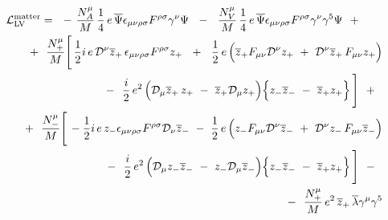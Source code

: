 \documentclass[12pt]{revtex4}
\newcommand{\slashed}[1]{\hbox{{$#1$}\llap{$/$}}}
\begin{document}
\begin{eqnarray}
\nonumber
\lefteqn{
     \mathcal{L}_{\mathrm{LV}}^{\mathrm{matter}}  = 
~~      %
-~
\frac{N_A^\mu}{M}\,
\frac{1}{4} \,e\,
\overline{\Psi} \epsilon_{\mu\nu\rho\sigma}
F^{\rho\sigma} \gamma^\nu \Psi      
~~-~~
\frac{N_V^\mu}{M}\,
\frac{1}{4} \,e\,
\overline{\Psi} \epsilon_{\mu\nu\rho\sigma}
F^{\rho\sigma} \gamma^\nu \gamma^5 \Psi 
~~+~~ 
}\\
\nonumber
&&
~~+~~
\frac{N_+^\mu}{M}
\Bigg[\,
\frac{1}{2}i \,e \, 
\mathcal{D}^\nu \overline{z}_+ \,
\epsilon_{\mu\nu\rho\sigma}F^{\rho\sigma} z_+ 
~~+~~
\frac{1}{2}\, e\,
\Big(
  \overline{z}_+ F_{\mu\nu}
  \mathcal{D}^\nu z_+ 
  ~+~
  \mathcal{D}^\nu \overline{z}_+ \,
  F_{\mu\nu} z_+
\Big) 
\\
\nonumber
&&
               \qquad
~~-~~
\frac{i}{2}\, e^2\,
\Big(
  \mathcal{D}_\mu \overline{z}_+ \,
   z_+ 
  ~-~
  \overline{z}_+ \mathcal{D}_\mu z_+
\Big)
\Big\{
  z_-  \overline{z}_- 
  ~-~
  \overline{z}_+  z_+
\Big\}
\,\Bigg] ~~+~~ \\
\nonumber
&&
~~+~~
\frac{N_-^\mu}{M}
\Bigg[\,
- \frac{1}{2} i\, e\,
z_- \epsilon_{\mu\nu\rho\sigma}F^{\rho\sigma}
\mathcal{D}_\nu \overline{z}_- 
~-~
\frac{1}{2}\, e\,
\Big(
  z_- F_{\mu\nu}\mathcal{D}^\nu \overline{z}_- 
  ~+~
  \mathcal{D}^\nu z_- \,
  F_{\mu\nu} \overline{z}_- 
\Big)
\\
\nonumber
&&
               \qquad
~~-~~ 
\frac{i}{2}\, e^2\,
\Big(
  \mathcal{D}_\mu z_- \overline{z}_-
  ~-~
  z_- \mathcal{D}_\mu \overline{z}_-
\Big)
\Big\{
  z_- \overline{z}_- 
  ~-~
  \overline{z}_+ z_+
\Big\}
\,\Bigg]
~~-~~ \\
\nonumber
&&
~~-~~
\frac{N_+^\mu}{M}\, e^2\,
\overline{z}_+ \, \overline{\lambda} \gamma^\mu \gamma^5 

\end{eqnarray}
\end{document}
